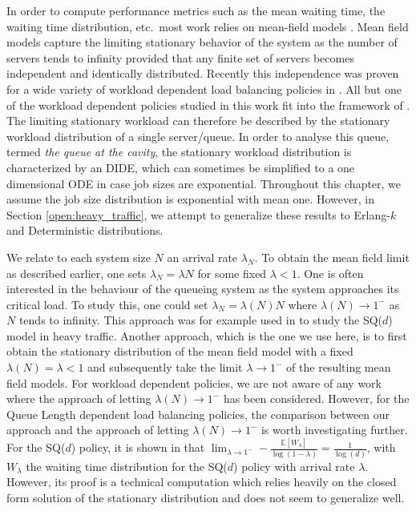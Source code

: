 \documentclass[12pt]{report}
\newcommand{\E}{\mathbb{E}}
\begin{document}
In order to compute performance metrics such as the mean waiting time, the waiting time distribution, etc.~most work relies on mean-field models \cite{kurtz1, shneer2020large, hellemans2019workload, jinan2020load, bramsonLB}. Mean field models capture
the limiting stationary behavior of the system as the number of servers tends to infinity
provided that any finite set of servers becomes independent and identically distributed.  Recently this independence was proven for a wide variety of workload dependent load balancing policies in \cite{shneer2020large}. All but one of the workload dependent policies studied in this work fit into the framework of \cite{shneer2020large}. The limiting stationary
workload can therefore be described by the stationary workload distribution of a single server/queue. In order to analyse this queue, termed {\it the queue at the cavity}, the stationary workload distribution is characterized by an DIDE, which can sometimes be simplified to a one dimensional ODE in case job sizes are exponential. Throughout this chapter, we assume the job size distribution is exponential with mean one. However, in Section \ref{open:heavy_traffic}, we attempt to generalize these results to Erlang-$k$ and Deterministic distributions.

We relate to each system size $N$ an arrival rate $\lambda_N$. To obtain the mean field limit as described earlier, one sets $\lambda_N=\lambda N$ for some fixed $\lambda < 1$. One is often interested in the behaviour of the queueing system as the system approaches its critical load. To study this, one could set $\lambda_N = \lambda(N) N$ where $\lambda(N) \rightarrow 1^-$ as $N$ tends to infinity. This approach was for example used in \cite{liu2020steady1, liu2020steady2, brightwell2012supermarket, eschenfeldt2018join} to study the SQ($d$) model in heavy traffic. Another approach, which is the one we use here, is to first obtain the stationary distribution of the mean field model with a fixed $\lambda(N)=\lambda < 1$ and subsequently take the limit $\lambda \rightarrow 1^-$ of the resulting mean field models. For workload dependent policies, we are not aware of any work where the approach of letting $\lambda(N) \rightarrow 1^-$ has been considered. However, for the Queue Length dependent load balancing policies, the comparison between our approach and the approach of letting $\lambda(N) \rightarrow 1^-$ is worth investigating further. For the SQ($d$) policy, it is shown in \cite{mitzenmacher2001power} that $\lim_{\lambda\rightarrow 1^-} - \frac{\E[W_\lambda]}{\log(1-\lambda)} = \frac{1}{\log(d)}$, with $W_\lambda$ the waiting time distribution for the SQ($d$) policy with arrival rate $\lambda$. However, its proof is a technical computation which relies heavily on the closed form solution of the stationary distribution and does not seem to generalize well.
\end{document}
